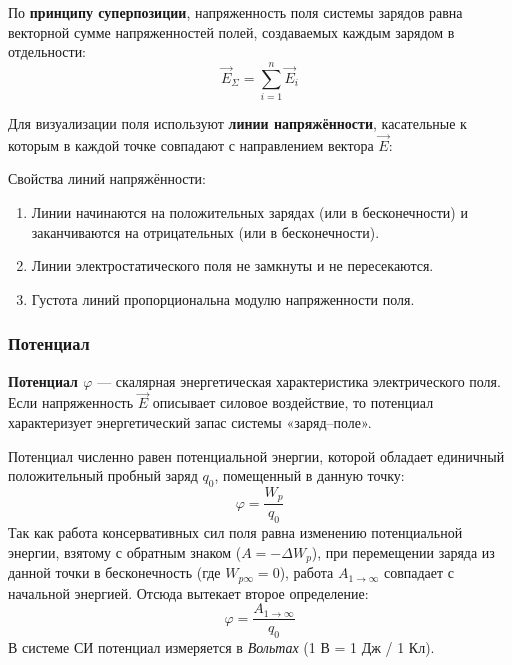По \textbf{принципу суперпозиции}, напряженность поля системы зарядов равна векторной сумме напряженностей полей, создаваемых каждым зарядом в отдельности:
\[
    \vec{E}_{\Sigma} = \sum_{i=1}^{n} \vec{E}_i
\]

Для визуализации поля используют \textbf{линии напряжённости}, касательные к которым в каждой точке совпадают с направлением вектора $\vec{E}$:

\begin{center}
\end{center}

Свойства линий напряжённости:
\begin{enumerate}
    \item Линии начинаются на положительных зарядах (или в бесконечности) и заканчиваются на отрицательных (или в бесконечности).
    \item Линии электростатического поля не замкнуты и не пересекаются.
    \item Густота линий пропорциональна модулю напряженности поля.
\end{enumerate}

\subsubsection{Потенциал}

\textbf{Потенциал $\varphi$} --- скалярная энергетическая характеристика электрического поля. Если напряженность $\vec{E}$ описывает силовое воздействие, то потенциал характеризует энергетический запас системы «заряд--поле».

Потенциал численно равен потенциальной энергии, которой обладает единичный положительный пробный заряд $q_0$, помещенный в данную точку:
\[
    \varphi = \frac{W_p}{q_0}
\]
Так как работа консервативных сил поля равна изменению потенциальной энергии, взятому с обратным знаком ($A = -\Delta W_p$), при перемещении заряда из данной точки в бесконечность (где $W_{p\infty} = 0$), работа $A_{1 \to \infty}$ совпадает с начальной энергией. Отсюда вытекает второе определение:
\[
    \varphi = \frac{A_{1 \to \infty}}{q_0}
\]
В системе СИ потенциал измеряется в \textit{Вольтах} (1 В = 1 Дж / 1 Кл).

